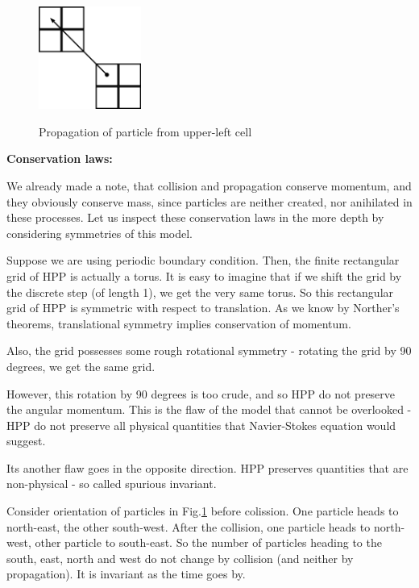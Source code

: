 \begin{figure} [h]
 \centering
 \includegraphics[width=0.3\textwidth]{./img/propleft}
 \label{hpp-colision}
 \caption{Propagation of particle from upper-left cell}
\end{figure}

\bigskip

\textbf{Conservation laws:}

We already made a note, that collision and propagation conserve momentum, and they obviously conserve mass, since particles are neither created, nor anihilated in these processes. 
Let us inspect these conservation laws in the more depth by considering symmetries of this model.

Suppose we are using periodic boundary condition. Then, the finite rectangular grid of HPP is actually a torus. It is easy to imagine that if we shift the grid by the discrete step (of length 1), we get the very same torus.
So this rectangular grid of HPP is symmetric with respect to translation.
As we know by Norther's theorems, translational symmetry implies conservation of momentum.

\bigskip

Also, the grid possesses some rough rotational symmetry - rotating the grid by 90 degrees, we get the same grid.

However, this rotation by 90 degrees is too crude, and so HPP do not preserve the angular momentum. This is the flaw of the model that cannot be overlooked - HPP do not preserve all physical quantities that Navier-Stokes equation would suggest.

Its another flaw goes in the opposite direction. HPP preserves quantities that are non-physical - so called spurious invariant.

Consider orientation of particles in Fig.\ref{hpp-colision} before colission.
One particle heads to north-east, the other south-west.
After the collision, one particle heads to north-west, other particle to south-east.
So the number of particles heading to the south, east, north and west do not change by collision (and neither by propagation). It is invariant as the time goes by.

